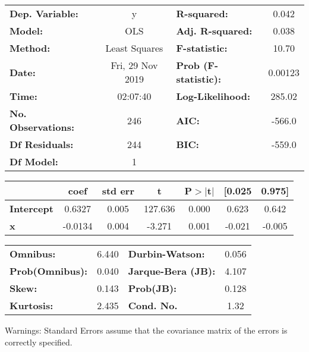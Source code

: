 \documentclass{report}
\begin{document}
\begin{center}
\begin{tabular}{lclc}
\toprule
\textbf{Dep. Variable:}    &        y         & \textbf{  R-squared:         } &     0.042   \\
\textbf{Model:}            &       OLS        & \textbf{  Adj. R-squared:    } &     0.038   \\
\textbf{Method:}           &  Least Squares   & \textbf{  F-statistic:       } &     10.70   \\
\textbf{Date:}             & Fri, 29 Nov 2019 & \textbf{  Prob (F-statistic):} &  0.00123    \\
\textbf{Time:}             &     02:07:40     & \textbf{  Log-Likelihood:    } &    285.02   \\
\textbf{No. Observations:} &         246      & \textbf{  AIC:               } &    -566.0   \\
\textbf{Df Residuals:}     &         244      & \textbf{  BIC:               } &    -559.0   \\
\textbf{Df Model:}         &           1      & \textbf{                     } &             \\
\bottomrule
\end{tabular}
\begin{tabular}{lcccccc}
                   & \textbf{coef} & \textbf{std err} & \textbf{t} & \textbf{P$>$$|$t$|$} & \textbf{[0.025} & \textbf{0.975]}  \\
\midrule
\textbf{Intercept} &       0.6327  &        0.005     &   127.636  &         0.000        &        0.623    &        0.642     \\
\textbf{x}         &      -0.0134  &        0.004     &    -3.271  &         0.001        &       -0.021    &       -0.005     \\
\bottomrule
\end{tabular}
\begin{tabular}{lclc}
\textbf{Omnibus:}       &  6.440 & \textbf{  Durbin-Watson:     } &    0.056  \\
\textbf{Prob(Omnibus):} &  0.040 & \textbf{  Jarque-Bera (JB):  } &    4.107  \\
\textbf{Skew:}          &  0.143 & \textbf{  Prob(JB):          } &    0.128  \\
\textbf{Kurtosis:}      &  2.435 & \textbf{  Cond. No.          } &     1.32  \\
\bottomrule
\end{tabular}
\end{center}

Warnings: \newline
 [1] Standard Errors assume that the covariance matrix of the errors is correctly specified.
\end{document}
